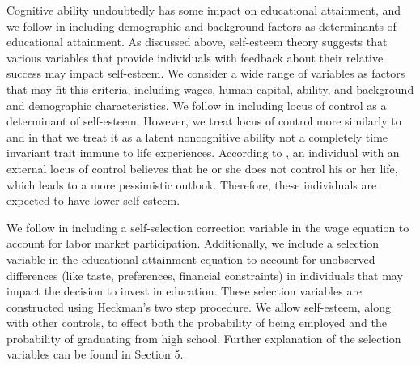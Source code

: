 \documentclass[12pt]{report}
\newcommand{\citee}[1]{\citename{#1} \citeyear{#1}}
\begin{document}
Cognitive ability undoubtedly has some impact on educational attainment, and we follow \citee{HSU2006} in including demographic and background factors as determinants of educational attainment. As discussed above, self-esteem theory suggests that various variables that provide individuals with feedback about their relative success may impact self-esteem. We consider a wide range of variables as factors that may fit this criteria, including wages, human capital, ability, and background and demographic characteristics. We follow \citee{GVD1997} in including locus of control as a determinant of self-esteem. However, we treat locus of control more similarly to \citee{PP2010} and \citee{HSU2006} in that we treat it as a latent noncognitive ability not a completely time invariant trait immune to life experiences. According to \citee{FPW2007}, an individual with an external locus of control believes that he or she does not control his or her life, which leads to a more pessimistic outlook. Therefore, these individuals are expected to have lower self-esteem.

We follow \citee{H1979} in including a self-selection correction variable in the wage equation to account for labor market participation. Additionally, we include a selection variable in the educational attainment equation to account for unobserved differences (like taste, preferences, financial constraints) in individuals that may impact the decision to invest in education. These selection variables are constructed using Heckman's two step procedure. We allow self-esteem, along with other controls, to effect both the probability of being employed and the probability of graduating from high school. Further explanation of the selection variables can be found in Section 5.
\end{document}
